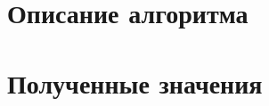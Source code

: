 \documentclass{article}
\begin{document}
\section{Описание алгоритма}
\section{Полученные значения}
\end{document}
